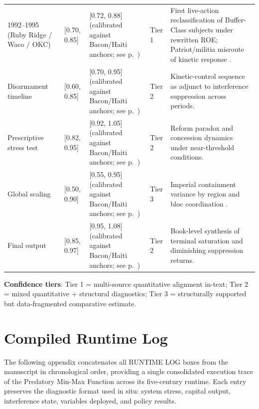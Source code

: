 \begin{longtable}{>{\raggedright}p{3.4cm} >{\raggedright}p{2.3cm} >{\raggedright}p{2.1cm} >{\raggedright}p{2.4cm} >{\raggedright\arraybackslash}p{4.9cm}}
1992--1995 (Ruby Ridge / Waco / OKC) & [0.70, 0.85] & [0.72, 0.88] (calibrated against Bacon/Haiti anchors; see p.~\pageref{ch:empirical_methodology}) & Tier 1 & First live-action reclassification of Buffer-Class subjects under rewritten ROE; Patriot/militia misroute of kinetic response \cite{dojruby1994, oprruby2001, danforth2000, treasury1993waco, splc_patriot_timeline, pitcavage2001}. \\
Disarmament timeline & [0.60, 0.85] & [0.70, 0.95] (calibrated against Bacon/Haiti anchors; see p.~\pageref{ch:empirical_methodology}) & Tier 2 & Kinetic-control sequence as adjunct to interference suppression across periods. \\
Prescriptive stress test & [0.82, 0.95] & [0.92, 1.05] (calibrated against Bacon/Haiti anchors; see p.~\pageref{ch:empirical_methodology}) & Tier 2 & Reform paradox and concession dynamics under near-threshold conditions. \\
Global scaling & [0.50, 0.90] & [0.55, 0.95] (calibrated against Bacon/Haiti anchors; see p.~\pageref{ch:empirical_methodology}) & Tier 3 & Imperial containment variance by region and bloc coordination \cite{ohchr2026}. \\
Final output & [0.85, 0.97] & [0.95, 1.08] (calibrated against Bacon/Haiti anchors; see p.~\pageref{ch:empirical_methodology}) & Tier 2 & Book-level synthesis of terminal saturation and diminishing suppression returns. \\
\bottomrule
\end{longtable}

\textbf{Confidence tiers}: Tier 1 = multi-source quantitative alignment in-text; Tier 2 = mixed quantitative + structural diagnostics; Tier 3 = structurally supported but data-fragmented comparative estimate.

\chapter{Compiled Runtime Log}
\label{sec:runtime_log}

The following appendix concatenates all RUNTIME LOG boxes from the manuscript in chronological order, providing a single consolidated execution trace of the Predatory Min-Max Function across its five-century runtime. Each entry preserves the diagnostic format used in situ: system stress, capital output, interference state, variables deployed, and policy results.

\bigskip

